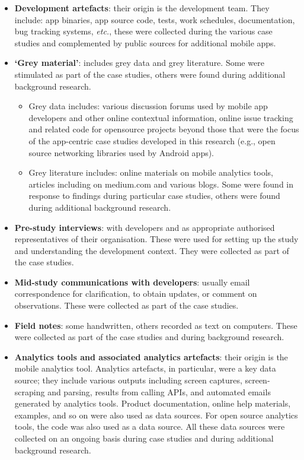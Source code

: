 \begin{itemize}
    \itemsep0em
    \item \textbf{Development artefacts}: their origin is the development team. They include: app binaries, app source code, tests, work schedules, documentation, bug tracking systems, \textit{etc.}, these were collected during the various case studies and complemented by public sources for additional mobile apps. 
    \item \textbf{`Grey material'}: includes grey data and grey literature. Some were stimulated as part of the case studies, others were found during additional background research.
    \begin{itemize}
                \item Grey data includes: various discussion forums used by mobile app developers and other online contextual information, online issue tracking and related code for opensource projects beyond those that were the focus of the app-centric case studies developed in this research (e.g., open source networking libraries used by Android apps). 
                \item Grey literature includes: online materials on mobile analytics tools, articles including on medium.com and various blogs. Some were found in response to findings during particular case studies, others were found during additional background research.
    \end{itemize}
    \item \textbf{Pre-study interviews}: with developers and as appropriate authorised representatives of their organisation. These were used for setting up the study and understanding the development context. They were collected as part of the case studies.
    \item \textbf{Mid-study communications with developers}: usually email correspondence for clarification, to obtain updates, or comment on observations. These were collected as part of the case studies.
    \item \textbf{Field notes}: some handwritten, others recorded as text on computers. These were collected as part of the case studies and during background research.
    \item \textbf{Analytics tools and associated analytics artefacts}: their origin is the mobile analytics tool. Analytics artefacts, in particular, were a key data source; they include various outputs including screen captures, screen-scraping and parsing, results from calling APIs, and automated emails generated by analytics tools. Product documentation, online help materials, examples, and so on were also used as data sources. For open source analytics tools, the code was also used as a data source. All these data sources were collected on an ongoing basis during case studies and during additional background research.
\end{itemize}

